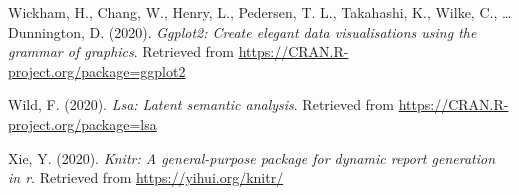 \documentclass[
  english,
  man,floatsintext]{apa6}
\begin{document}
\leavevmode\hypertarget{ref-R-ggplot2}{}%
Wickham, H., Chang, W., Henry, L., Pedersen, T. L., Takahashi, K., Wilke, C., \ldots{} Dunnington, D. (2020). \emph{Ggplot2: Create elegant data visualisations using the grammar of graphics}. Retrieved from \url{https://CRAN.R-project.org/package=ggplot2}

\leavevmode\hypertarget{ref-R-lsa}{}%
Wild, F. (2020). \emph{Lsa: Latent semantic analysis}. Retrieved from \url{https://CRAN.R-project.org/package=lsa}

\leavevmode\hypertarget{ref-R-knitr}{}%
Xie, Y. (2020). \emph{Knitr: A general-purpose package for dynamic report generation in r}. Retrieved from \url{https://yihui.org/knitr/}

\endgroup


\clearpage
\makeatletter
\efloat@restorefloats
\makeatother
\end{document}
